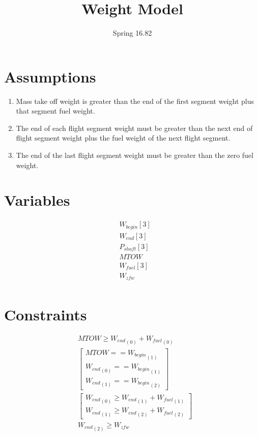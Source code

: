\documentclass[10pt, a4paper]{article}
\begin{document}
\title{Weight Model}
\author{Spring 16.82}
\maketitle

\section*{Assumptions} 

\begin{enumerate}

\item Mass take off weight is greater than the end of the first segment weight plus that segment fuel weight. 
\item The end of each flight segment weight must be greater than the next end of flight segment weight plus the fuel weight of the next flight segment.
\item The end of the last flight segment weight must be greater than the zero fuel weight.

\end{enumerate}

\section*{Variables}

\[\begin{array}{ll}
    & W_{begin}[3]\\
    & W_{end}[3]\\
    & P_{shaft}[3]\\
    & MTOW \\
    & W_{fuel}[3] \\
    & W_{zfw} \\
\end{array} \]

\section*{Constraints}

\[ \begin{array}{ll}
    & MTOW \geq {W_{end}}_{(0)} + {W_{fuel}}_{(0)} \\
    & \begin{bmatrix} MTOW == {W_{begin}}_{(1)} \\
    			      {W_{end}}_{(0)} == {W_{begin}}_{(1)} \\
    			      {W_{end}}_{(1)} == {W_{begin}}_{(2)} \end{bmatrix} \\
    & \begin{bmatrix}{W_{end}}_{(0)} \geq {W_{end}}_{(1)} + {W_{fuel}}_{(1)} \\ {W_{end}}_{(1)} \geq {W_{end}}_{(2)} + {W_{fuel}}_{(2)}\end{bmatrix} \\
	        & {W_{end}}_{(2)} \geq W_{zfw} \\
\end{array} \]
\end{document}
